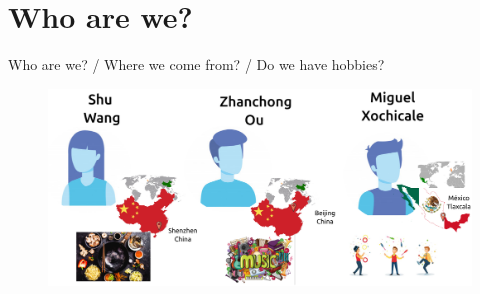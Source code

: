 \section{Who are we?}


{
\begin{frame}{Who are we? / Where we come from? / Do we have hobbies?}

  \begin{figure}
  \centering
  \includegraphics[width=1.0\textwidth]{./figures/who-we-are/versions/drawing-v02.png}
  \end{figure}

\end{frame}
}

